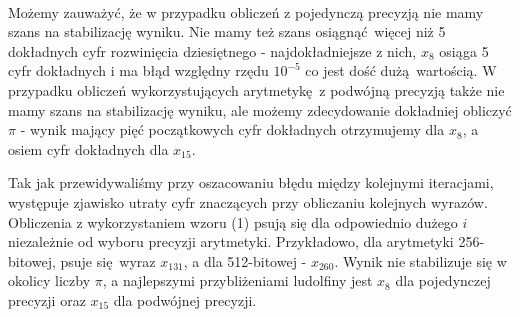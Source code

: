 \documentclass[10pt,wide]{mwart}
\theoremstyle{definition}
\begin{document}
\\
\par Możemy zauważyć, że w przypadku obliczeń z pojedynczą precyzją nie mamy szans na stabilizację wyniku.
Nie mamy też szans osiągnąć więcej niż 5 dokładnych cyfr rozwinięcia dziesiętnego - najdokładniejsze z nich, \(x_8\) osiąga 5 cyfr dokładnych i ma błąd względny rzędu \(10^{-5}\) co jest dość dużą wartością.
W przypadku obliczeń wykorzystujących arytmetykę z podwójną precyzją także nie mamy szans na stabilizację wyniku, ale możemy zdecydowanie dokładniej obliczyć \(\pi\)
- wynik mający pięć początkowych cyfr dokładnych otrzymujemy dla \(x_8\), a osiem cyfr dokładnych dla \(x_{15}\).
\par Tak jak przewidywaliśmy przy oszacowaniu błędu między kolejnymi iteracjami, występuje zjawisko utraty cyfr znaczących przy obliczaniu kolejnych wyrazów.
Obliczenia z wykorzystaniem wzoru (1) psują się dla odpowiednio dużego \(i\) niezależnie od wyboru precyzji arytmetyki.
Przykładowo, dla arytmetyki 256-bitowej, psuje się wyraz \(x_{131}\), a dla 512-bitowej - \(x_{260}\). Wynik nie stabilizuje się w okolicy liczby \(\pi\),
a najlepszymi przybliżeniami ludolfiny jest \(x_8\) dla pojedynczej precyzji oraz \(x_{15}\) dla podwójnej precyzji.
\end{document}
